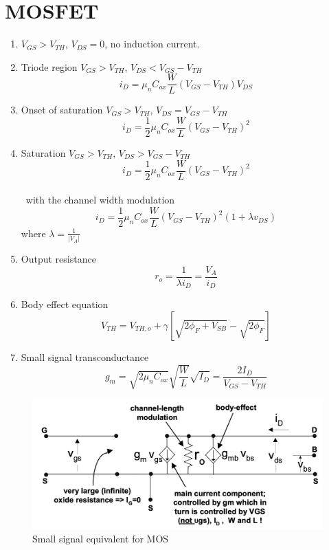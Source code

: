 \documentclass{article}
\begin{document}
\section{MOSFET}
\begin{enumerate}
	\item $V_{GS}>V_{TH}$, $V_{DS}=0$, no induction current.
	\item Triode region $V_{GS}>V_{TH}$,  $V_{DS}<V_{GS}-V_{TH}$ \[i_{D} = \mu_{n}C_{ox}\frac{W}{L}(V_{GS}-V_{TH})V_{DS}\]
	\item Onset of saturation $V_{GS}>V_{TH}$,  $V_{DS}=V_{GS}-V_{TH}$ \[i_{D} = \frac{1}{2}\mu_{n}C_{ox}\frac{W}{L}(V_{GS}-V_{TH})^{2}\]
	\item Saturation $V_{GS}>V_{TH}$,  $V_{DS}>V_{GS}-V_{TH}$ \[i_{D} = \frac{1}{2}\mu_{n}C_{ox}\frac{W}{L}(V_{GS}-V_{TH})^{2}\] \\\ with the channel width modulation \[i_{D} =\frac{1}{2} \mu_{n}C_{ox}\frac{W}{L}(V_{GS}-V_{TH})^{2}(1+\lambda v_{DS})\] where $\lambda=\frac{1}{\lvert V_{A} \rvert}$
	\item Output resistance \[r_{o}=\frac{1}{\lambda i_{D}}=\frac{V_{A}}{i_{D}}\]
	\item Body effect equation \[V_{TH}=V_{TH,o}+\gamma[\sqrt{2\phi_{F}+V_{SB}}-\sqrt{2\phi_{F}}]\]
	\item Small signal transconductance \[g_{m}=\sqrt{2\mu_{n}C_{ox}}\sqrt{\frac{W}{L}}\sqrt{I_{D}}=\frac{2I_{D}}{V_{GS}-V_{TH}}\]
\end{enumerate}
\begin{figure}[H]\centering
\includegraphics[width=.6\textwidth]{mos_ss}
\caption{Small signal equivalent for MOS}
\end{figure}
\end{document}
